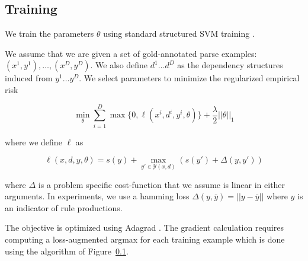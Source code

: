 \documentclass[11pt,letterpaper]{article}
\DeclareMathOperator*{\argmin}{arg\,min}
\begin{document}
\subsection{Training}

We train the parameters $\theta$ using standard structured SVM training \cite{}.

We assume that we are given a set of gold-annotated parse examples: $( x^{1}, y^{1}), \ldots,  (x^{D}, y^{D})$. We also define $d^{1} \ldots d^{D}$ as the dependency structures induced from $y^{1} \ldots y^{D}$.
We select parameters to minimize the regularized empirical risk

\[ \min_{\theta} \sum_{i = 1}^D \max\{0,  \ell( x^{i}, d^{i} , y^{i}, \theta) \} + \frac{\lambda}{2} ||\theta||_1 \]

\noindent where we define $\ell$ as

\[\ell(x, d, y, \theta) = s(y) + \max_{y' \in \mathcal{Y}(x, d)}\left(s(y')  + \Delta(y, y') \right) \]


\noindent where $\Delta$ is a problem specific cost-function that we assume is linear in either arguments.
In experiments, we use a hamming loss  $\Delta(y, \bar{y}) = || y - \bar{y}||$ where $y$ is an indicator
of rule productions.

The objective is optimized using Adagrad \cite{}.  The gradient
calculation requires computing a loss-augmented argmax for each
training example which is done using the algorithm of Figure~\ref{}.






\end{document}
